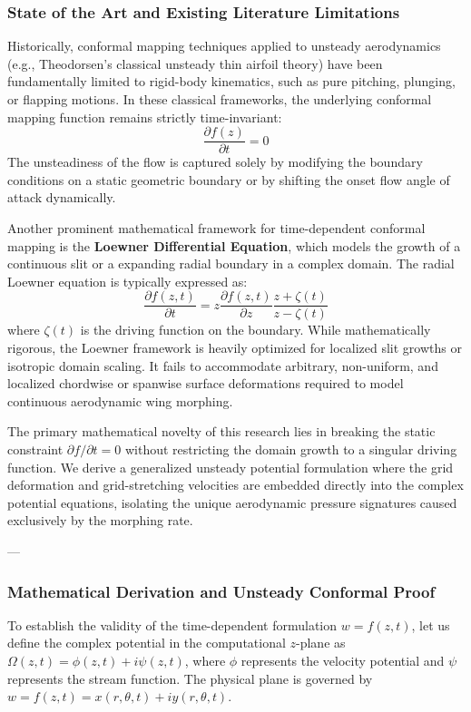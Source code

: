 \documentclass[12pt,a4paper]{article}
\begin{document}
\subsubsection{State of the Art and Existing Literature Limitations}
Historically, conformal mapping techniques applied to unsteady aerodynamics (e.g., Theodorsen's classical unsteady thin airfoil theory) have been fundamentally limited to rigid-body kinematics, such as pure pitching, plunging, or flapping motions. In these classical frameworks, the underlying conformal mapping function remains strictly time-invariant:
\begin{equation}
    \frac{\partial f(z)}{\partial t} = 0
\end{equation}
The unsteadiness of the flow is captured solely by modifying the boundary conditions on a static geometric boundary or by shifting the onset flow angle of attack dynamically.

Another prominent mathematical framework for time-dependent conformal mapping is the \textbf{Loewner Differential Equation}, which models the growth of a continuous slit or a expanding radial boundary in a complex domain. The radial Loewner equation is typically expressed as:
\begin{equation}
    \frac{\partial f(z,t)}{\partial t} = z \frac{\partial f(z,t)}{\partial z} \frac{z + \zeta(t)}{z - \zeta(t)}
\end{equation}
where $\zeta(t)$ is the driving function on the boundary. While mathematically rigorous, the Loewner framework is heavily optimized for localized slit growths or isotropic domain scaling. It fails to accommodate arbitrary, non-uniform, and localized chordwise or spanwise surface deformations required to model continuous aerodynamic wing morphing. 

The primary mathematical novelty of this research lies in breaking the static constraint $\partial f/\partial t = 0$ without restricting the domain growth to a singular driving function. We derive a generalized unsteady potential formulation where the grid deformation and grid-stretching velocities are embedded directly into the complex potential equations, isolating the unique aerodynamic pressure signatures caused exclusively by the morphing rate.

---

\subsubsection{Mathematical Derivation and Unsteady Conformal Proof}
To establish the validity of the time-dependent formulation $w = f(z,t)$, let us define the complex potential in the computational $z$-plane as $\Omega(z,t) = \phi(z,t) + i\psi(z,t)$, where $\phi$ represents the velocity potential and $\psi$ represents the stream function. The physical plane is governed by $w = f(z,t) = x(r,\theta,t) + iy(r,\theta,t)$.
\end{document}
